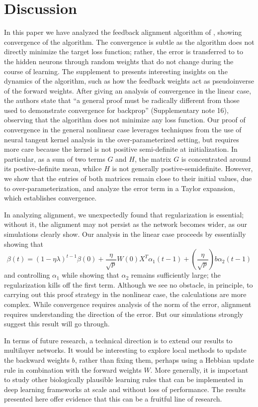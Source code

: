 \section{Discussion}

In this paper we have analyzed the feedback alignment algorithm of
\cite{lillicrap2016random}, showing convergence of the algorithm. The convergence is subtle as the algorithm does not directly minimize the target loss function; rather, the error is transferred to to the hidden neurons through random weights that do not change during the course of learning.
The supplement to \cite{lillicrap2016random} presents interesting insights on the dynamics of the algorithm, such as how the feedback weights act as pseudoinverse of the forward weights. After giving an analysis of convergence in the linear case, the authors state that
``a general proof must be radically different from those used to demonstrate convergence for backprop'' (Supplementary note 16), observing that the algorithm does not minimize any loss function. Our proof of convergence in the general nonlinear case leverages techniques from
the use of neural tangent kernel analysis in the over-parameterized setting, but requires more care because the kernel is not positive semi-definite at initialization. In particular, as a sum of two terms $G$ and $H$, the matrix $G$ is concentrated around its postive-definite mean, whilce  $H$ is not generally postive-semidefinite. However, we show that the entries of both matrices remain close to their initial values, due to over-parameterization, and analyze the error term in a Taylor expansion, which establishes convergence.

In analyzing alignment, we unexpectedly found that regularization is essential; without it, the alignment may not persist as the network becomes wider, as our simulations clearly show.
Our analysis in the linear case proceeds by essentially showing that
$$\beta(t) = (1-\eta \lambda)^{t-1} \beta(0) + \frac{\eta}{\sqrt{p}} W(0) X^T \alpha_1(t-1) +
\left(\frac{\eta}{\sqrt{p}} \right) b \alpha_2(t-1)$$
and controlling $\alpha_1$ while showing that $\alpha_2$ remains sufficiently large; the
regularization kills off the first term.
Although we see no obstacle, in principle, to carrying out this proof strategy in the nonlinear
case, the calculations are more complex. While convergence requires analysis of the norm of the error, alignment requires understanding the direction of the error. But our simulations strongly suggest this result will go through.

In terms of future research, a technical direction is to extend our results to multilayer networks. It would be interesting to explore local methods to update the backward weights $b$, rather than fixing them, perhaps using a Hebbian update rule in combination with the forward weights $W$. More generally, it is important to study other biologically plausible learning rules that can be implemented in deep learning frameworks at scale and without loss of performance.  The results presented here offer evidence that this can be a fruitful line of research.
